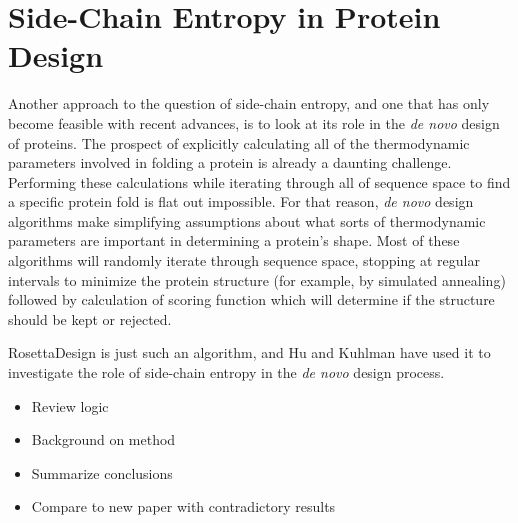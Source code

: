 \section*{Side-Chain Entropy in Protein Design}
\label{sec:side_chain_entropy_in_protein_design}
Another approach to the question of side-chain entropy, and one that has only become feasible with recent advances, is to look at its role in the \emph{de novo} design of proteins. The prospect of explicitly calculating all of the thermodynamic parameters involved in folding a protein is already a daunting challenge. Performing these calculations while iterating through all of sequence space to find a specific protein fold is flat out impossible. For that reason, \emph{de novo} design algorithms make simplifying assumptions about what sorts of thermodynamic parameters are important in determining a protein's shape. Most of these algorithms will randomly iterate through sequence space, stopping at regular intervals to minimize the protein structure (for example, by simulated annealing) followed by calculation of scoring function which will determine if the structure should be kept or rejected.

RosettaDesign is just such an algorithm, and Hu and Kuhlman have used it to investigate the role of side-chain entropy in the \emph{de novo} design process\cite{Hu:2006p68}.

\begin{itemize}
	\item Review logic
	\item Background on method
	\item Summarize conclusions
	\item Compare to new paper with contradictory results
\end{itemize}
